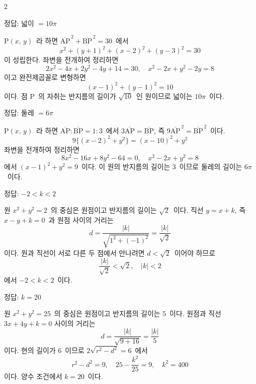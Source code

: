 \documentclass[10pt,fleqn]{article}
\begin{document}
\begin{multicols*}{2}
\begin{dmanswerbox}
정답: 넓이 $=10\pi$
\end{dmanswerbox}

$\mathrm{P}(x,\, y)$\ 라 하면 $\overline{\mathrm{AP}}^{\,2} + \overline{\mathrm{BP}}^{\,2} = 30$\ 에서
\[ x^2 + (y+1)^2 + (x-2)^2 + (y-3)^2 = 30 \]
이 성립한다. 좌변을 전개하여 정리하면
\[ 2x^2 - 4x + 2y^2 - 4y + 14 = 30,\quad x^2 - 2x + y^2 - 2y = 8 \]
이고 완전제곱꼴로 변형하면
\[ (x - 1)^2 + (y - 1)^2 = 10 \]
이다. 점 $\mathrm{P}$\ 의 자취는 반지름의 길이가 $\sqrt{10}$\ 인 원이므로 넓이는 $10\pi$\ 이다.

\begin{dmanswerbox}
정답: 둘레 $=6\pi$
\end{dmanswerbox}

$\mathrm{P}(x,\, y)$\ 라 하면 $\overline{\mathrm{AP}} : \overline{\mathrm{BP}} = 1 : 3$\ 에서 $3\overline{\mathrm{AP}} = \overline{\mathrm{BP}}$, 즉 $9\overline{\mathrm{AP}}^{\,2} = \overline{\mathrm{BP}}^{\,2}$\ 이다.
\[ 9\{(x-2)^2 + y^2\} = (x-10)^2 + y^2 \]
좌변을 전개하여 정리하면
\[ 8x^2 - 16x + 8y^2 - 64 = 0,\quad x^2 - 2x + y^2 = 8 \]
에서 $(x-1)^2 + y^2 = 9$\ 이다. 이 원의 반지름의 길이는 $3$\ 이므로 둘레의 길이는 $6\pi$\ 이다.

\begin{dmanswerbox}
정답: $-2<k<2$
\end{dmanswerbox}

원 $x^2 + y^2 = 2$\ 의 중심은 원점이고 반지름의 길이는 $\sqrt{2}$\ 이다. 직선 $y = x + k$, 즉 $x - y + k = 0$\ 과 원점 사이의 거리는
\[ d = \dfrac{|k|}{\sqrt{1^2 + (-1)^2}} = \dfrac{|k|}{\sqrt{2}} \]
이다. 원과 직선이 서로 다른 두 점에서 만나려면 $d < \sqrt{2}$\ 이어야 하므로
\[ \dfrac{|k|}{\sqrt{2}} < \sqrt{2},\quad |k| < 2 \]
에서 $-2 < k < 2$\ 이다.

\begin{dmanswerbox}
정답: $k=20$
\end{dmanswerbox}

원 $x^2 + y^2 = 25$\ 의 중심은 원점이고 반지름의 길이는 $5$\ 이다. 원점과 직선 $3x + 4y + k = 0$ 사이의 거리는
\[ d = \dfrac{|k|}{\sqrt{9 + 16}} = \dfrac{|k|}{5} \]
이다. 현의 길이가 $6$\ 이므로 $2\sqrt{r^2 - d^2} = 6$\ 에서
\[ r^2 - d^2 = 9,\quad 25 - \dfrac{k^2}{25} = 9,\quad k^2 = 400 \]
이다. 양수 조건에서 $k = 20$\ 이다.


\end{multicols*}
\end{document}
